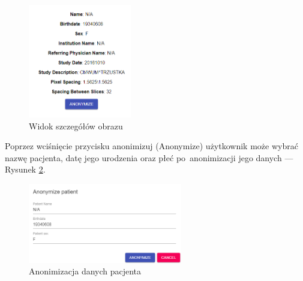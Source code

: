 \documentclass[a4paper,11pt,twoside,openright]{report}
\theoremstyle{definition}
\begin{document}
\begin{figure}[h!]
	\center
	\includegraphics[width=0.4\textwidth]{18}
	\caption{Widok szczegółów obrazu}
    	\label{fig:18}
\end{figure}

Poprzez wciśnięcie przycisku anonimizuj (Anonymize) użytkownik może wybrać nazwę
pacjenta, datę jego urodzenia oraz płeć po~anonimizacji jego danych --- Rysunek \ref{fig:19}.

\begin{figure}[h!]
	\center
	\includegraphics[width=0.6\textwidth]{19}
	\caption{Anonimizacja danych pacjenta}
    	\label{fig:19}
\end{figure}



\end{document}
